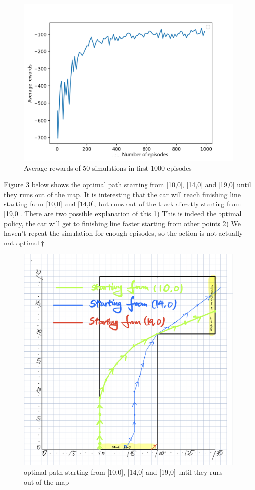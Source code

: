 \documentclass[12pt]{article}
\begin{document}
\begin{figure}
  \centering
     \includegraphics[scale = 0.5]{2.png}
  \caption{Average rewards of 50 simulations in first 1000 episodes}
\end{figure}

Figure 3 below shows the optimal path starting from [10,0], [14,0] and [19,0] until they runs out of the map. It is interesting that the car will reach finishing line starting form [10,0] and  [14,0], but runs out of the track directly starting from [19,0]. There are two possible explanation of this 1) This is indeed the optimal policy, the car will get to finishing line faster starting from other points 2) We haven't repeat the simulation for enough episodes, so the action is not actually not optimal.†

\begin{figure}
  \centering
     \includegraphics[scale = 0.24]{3.png}
  \caption{optimal path starting from [10,0], [14,0] and [19,0] until they runs out of the map}
\end{figure}
\end{document}
